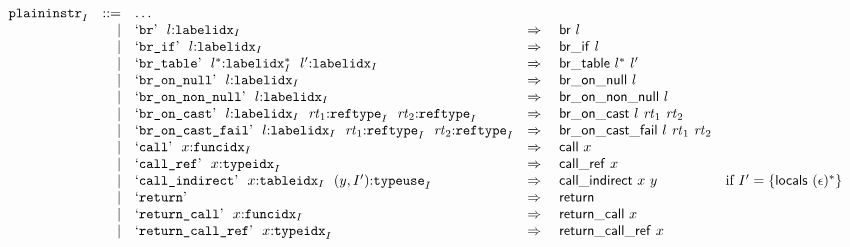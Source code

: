 \vspace{1ex}

$$
\begin{array}[t]{@{}lrrl@{}l@{}l@{}l@{}}
& {{\mathtt{plaininstr}}}_{I} & ::= & \dots \\
& & | & \mbox{‘\texttt{br}’}~~l{:}{{\mathtt{labelidx}}}_{I} & \quad\Rightarrow\quad{} & \mathsf{br}~l \\
& & | & \mbox{‘\texttt{br\_if}’}~~l{:}{{\mathtt{labelidx}}}_{I} & \quad\Rightarrow\quad{} & \mathsf{br\_if}~l \\
& & | & \mbox{‘\texttt{br\_table}’}~~{l^\ast}{:}{{{\mathtt{labelidx}}}_{I}^\ast}~~{l'}{:}{{\mathtt{labelidx}}}_{I} & \quad\Rightarrow\quad{} & \mathsf{br\_table}~{l^\ast}~{l'} \\
& & | & \mbox{‘\texttt{br\_on\_null}’}~~l{:}{{\mathtt{labelidx}}}_{I} & \quad\Rightarrow\quad{} & \mathsf{br\_on\_null}~l \\
& & | & \mbox{‘\texttt{br\_on\_non\_null}’}~~l{:}{{\mathtt{labelidx}}}_{I} & \quad\Rightarrow\quad{} & \mathsf{br\_on\_non\_null}~l \\
& & | & \mbox{‘\texttt{br\_on\_cast}’}~~l{:}{{\mathtt{labelidx}}}_{I}~~{\mathit{rt}}_1{:}{{\mathtt{reftype}}}_{I}~~{\mathit{rt}}_2{:}{{\mathtt{reftype}}}_{I} & \quad\Rightarrow\quad{} & \mathsf{br\_on\_cast}~l~{\mathit{rt}}_1~{\mathit{rt}}_2 \\
& & | & \mbox{‘\texttt{br\_on\_cast\_fail}’}~~l{:}{{\mathtt{labelidx}}}_{I}~~{\mathit{rt}}_1{:}{{\mathtt{reftype}}}_{I}~~{\mathit{rt}}_2{:}{{\mathtt{reftype}}}_{I} & \quad\Rightarrow\quad{} & \mathsf{br\_on\_cast\_fail}~l~{\mathit{rt}}_1~{\mathit{rt}}_2 \\
& & | & \mbox{‘\texttt{call}’}~~x{:}{{\mathtt{funcidx}}}_{I} & \quad\Rightarrow\quad{} & \mathsf{call}~x \\
& & | & \mbox{‘\texttt{call\_ref}’}~~x{:}{{\mathtt{typeidx}}}_{I} & \quad\Rightarrow\quad{} & \mathsf{call\_ref}~x \\
& & | & \mbox{‘\texttt{call\_indirect}’}~~x{:}{{\mathtt{tableidx}}}_{I}~~(y, {I'}){:}{{\mathtt{typeuse}}}_{I} & \quad\Rightarrow\quad{} & \mathsf{call\_indirect}~x~y & \quad \mbox{if}~ {I'} = \{ \mathsf{locals}~{(\epsilon)^\ast} \} \\
& & | & \mbox{‘\texttt{return}’} & \quad\Rightarrow\quad{} & \mathsf{return} \\
& & | & \mbox{‘\texttt{return\_call}’}~~x{:}{{\mathtt{funcidx}}}_{I} & \quad\Rightarrow\quad{} & \mathsf{return\_call}~x \\
& & | & \mbox{‘\texttt{return\_call\_ref}’}~~x{:}{{\mathtt{typeidx}}}_{I} & \quad\Rightarrow\quad{} & \mathsf{return\_call\_ref}~x \\

\end{array}$$
